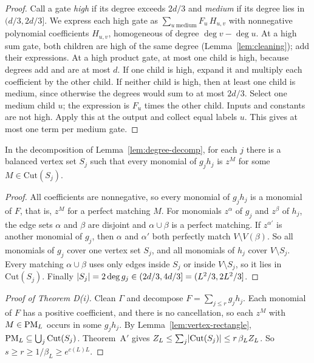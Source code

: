 \begin{proof}
Call a gate \emph{high} if its degree exceeds $2d/3$ and \emph{medium} if its degree lies in $(d/3,2d/3]$. We express each high gate as $\sum_{u\ \mathrm{medium}}F_u\,H_{u,v}$ with nonnegative polynomial coefficients $H_{u,v}$, homogeneous of degree $\deg v-\deg u$. At a high sum gate, both children are high of the same degree (Lemma~\ref{lem:cleaning}); add their expressions. At a high product gate, at most one child is high, because degrees add and are at most $d$. If one child is high, expand it and multiply each coefficient by the other child. If neither child is high, then at least one child is medium, since otherwise the degrees would sum to at most $2d/3$. Select one medium child $u$; the expression is $F_u$ times the other child. Inputs and constants are not high. Apply this at the output and collect equal labels $u$. This gives at most one term per medium gate.
\end{proof}

\begin{lemma}\label{lem:vertex-rectangle}
In the decomposition of Lemma~\ref{lem:degree-decomp}, for each $j$ there is a balanced vertex set $S_j$ such that every monomial of $g_jh_j$ is $z^M$ for some $M\in\mathrm{Cut}(S_j)$.
\end{lemma}

\begin{proof}
All coefficients are nonnegative, so every monomial of $g_jh_j$ is a monomial of $F$, that is, $z^M$ for a perfect matching $M$. For monomials $z^\alpha$ of $g_j$ and $z^\beta$ of $h_j$, the edge sets $\alpha$ and $\beta$ are disjoint and $\alpha\cup\beta$ is a perfect matching. If $z^{\alpha'}$ is another monomial of $g_j$, then $\alpha$ and $\alpha'$ both perfectly match $V\setminus V(\beta)$. So all monomials of $g_j$ cover one vertex set $S_j$, and all monomials of $h_j$ cover $V\setminus S_j$. Every matching $\alpha\cup\beta$ uses only edges inside $S_j$ or inside $V\setminus S_j$, so it lies in $\mathrm{Cut}(S_j)$. Finally $\lvert S_j\rvert=2\deg g_j\in(2d/3,4d/3]=(L^2/3,2L^2/3]$.
\end{proof}

\begin{proof}[Proof of Theorem D(i)]
Clean $\Gamma$ and decompose $F=\sum_{j\le r}g_jh_j$. Each monomial of $F$ has a positive coefficient, and there is no cancellation, so each $z^M$ with $M\in\mathrm{PM}_L$ occurs in some $g_jh_j$. By Lemma~\ref{lem:vertex-rectangle}, $\mathrm{PM}_L\subseteq\bigcup_j\mathrm{Cut}(S_j)$. Theorem~A$'$ gives $Z_L\le\sum_j\lvert \mathrm{Cut}(S_j)\rvert\le r\,\beta_LZ_L$. So $s\ge r\ge1/\beta_L\ge e^{c(L)L}$.
\end{proof}

